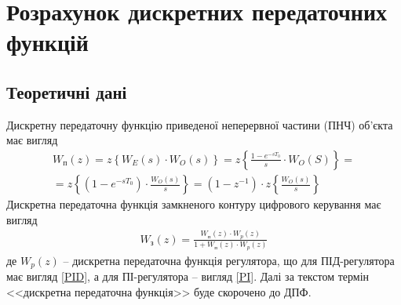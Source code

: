 \chapter{Розрахунок дискретних передаточних функцій}
\section{Теоретичні дані}


Дискретну передаточну функцію приведеної неперервної частини (ПНЧ)
об'єкта має вигляд
\begin{gather}
    \nonumber
    W_{\text{п}}(z) = z \left\{W_E(s) \cdot W_O(s) \right\} = 
    z\left\{ \frac{1-e^{-s T_0}}{s} \cdot W_O(S)\right\} = \\ =
    z\left\{\left(1 - e^{-s T_0}\right)\cdot \frac{W_O(s)}{s}\right\} = 
    \left(1 - z^{-1}\right) \cdot z\left\{\frac{W_O(s)}{s} \right\}
\end{gather}
Дискретна передаточна функція замкненого контуру цифрового керування має вигляд
\begin{gather}
    W_{\text{з}}(z) = \frac{
        W_{\text{п}}(z) \cdot W_p(z)
    }{1 + W_{\text{п}}(z) \cdot W_p(z)}
\end{gather}
де $W_p(z)$ -- дискретна передаточна функція регулятора, що для ПІД-регулятора
має вигляд \eqref{PID}, а для ПІ-регулятора -- вигляд \eqref{PI}.
Далі за текстом термін <<дискретна передаточна функція>> буде скорочено до ДПФ.

